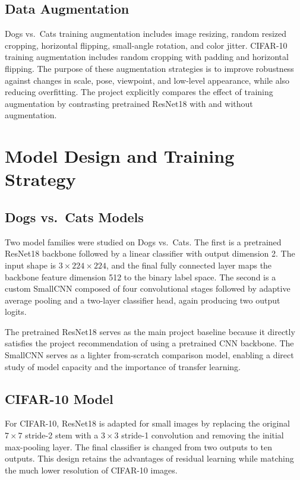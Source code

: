\documentclass[11pt,a4paper]{article}
\begin{document}
\subsection{Data Augmentation}
Dogs vs.\ Cats training augmentation includes image resizing, random resized cropping, horizontal flipping, small-angle rotation, and color jitter. CIFAR-10 training augmentation includes random cropping with padding and horizontal flipping. The purpose of these augmentation strategies is to improve robustness against changes in scale, pose, viewpoint, and low-level appearance, while also reducing overfitting. The project explicitly compares the effect of training augmentation by contrasting pretrained ResNet18 with and without augmentation.

\section{Model Design and Training Strategy}

\subsection{Dogs vs.\ Cats Models}
Two model families were studied on Dogs vs.\ Cats. The first is a pretrained ResNet18 backbone followed by a linear classifier with output dimension 2. The input shape is $3 \times 224 \times 224$, and the final fully connected layer maps the backbone feature dimension 512 to the binary label space. The second is a custom SmallCNN composed of four convolutional stages followed by adaptive average pooling and a two-layer classifier head, again producing two output logits.

The pretrained ResNet18 serves as the main project baseline because it directly satisfies the project recommendation of using a pretrained CNN backbone. The SmallCNN serves as a lighter from-scratch comparison model, enabling a direct study of model capacity and the importance of transfer learning.

\subsection{CIFAR-10 Model}
For CIFAR-10, ResNet18 is adapted for small images by replacing the original $7\times7$ stride-2 stem with a $3\times3$ stride-1 convolution and removing the initial max-pooling layer. The final classifier is changed from two outputs to ten outputs. This design retains the advantages of residual learning while matching the much lower resolution of CIFAR-10 images.
\end{document}
